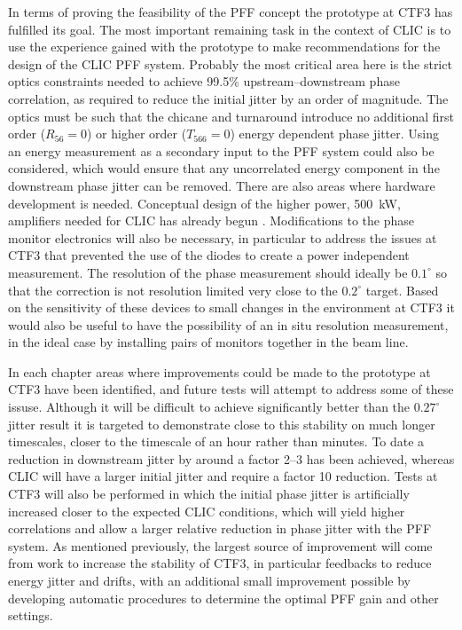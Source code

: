 In terms of proving the feasibility of the PFF concept the prototype at CTF3 has fulfilled its goal.  The most important remaining task in the context of CLIC is to use the experience gained with the prototype to make recommendations for the design of the CLIC PFF system. Probably the most critical area here is the strict optics constraints needed to achieve 99.5\% upstream--downstream phase correlation, as required to reduce the initial jitter by an order of magnitude. The optics must be such that the chicane and turnaround introduce no additional first order (\(R_{56} = 0\)) or higher order (\(T_{566} = 0\)) energy dependent phase jitter. Using an energy measurement as a secondary input to the PFF system could also be considered, which would ensure that any uncorrelated energy component in the downstream phase jitter can be removed. There are also areas where hardware development is needed. Conceptual design of the higher power, 500~kW, amplifiers needed for CLIC has already begun \cite{colinCLIC16}. Modifications to the phase monitor electronics will also be necessary, in particular to address the issues at CTF3 that prevented the use of the diodes to create a power independent measurement. The resolution of the phase measurement should ideally be \(0.1^\circ\) so that the correction is not resolution limited very close to the \(0.2^\circ\) target. Based on the sensitivity of these devices to small changes in the environment at CTF3 it would also be useful to have the possibility of an in situ resolution measurement, in the ideal case by installing pairs of monitors together in the beam line.

In each chapter areas where improvements could be made to the prototype at CTF3 have been identified, and future tests will attempt to address some of these issuse. Although it will be difficult to achieve significantly better than the \(0.27^\circ\) jitter result it is targeted to demonstrate close to this stability on much longer timescales, closer to the timescale of an hour rather than minutes. To date a reduction in downstream jitter by around a factor 2--3 has been achieved, whereas CLIC will have a larger initial jitter and require a factor 10 reduction. Tests at CTF3 will also be performed in which the initial phase jitter is artificially increased closer to the expected CLIC conditions, which will yield higher correlations and allow a larger relative reduction in phase jitter with the PFF system. As mentioned previously, the largest source of improvement will come from work to increase the stability of CTF3, in particular feedbacks to reduce energy jitter and drifts, with an additional small improvement possible by developing automatic procedures to determine the optimal PFF gain and other settings.

